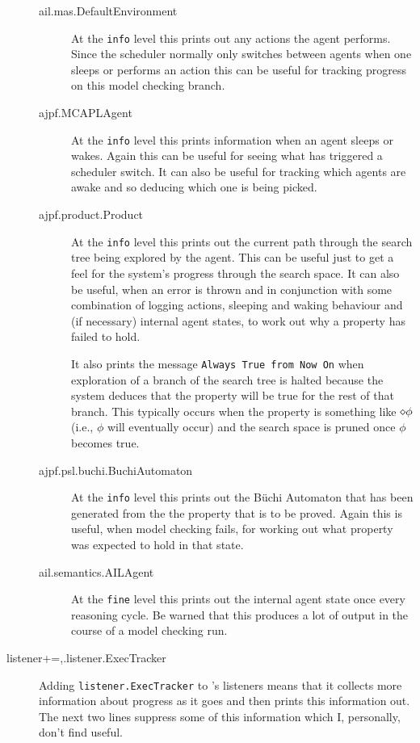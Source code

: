 \documentclass[a4]{article}
\begin{document}
\begin{sloppypar}
\begin{description}
\begin{description}
\item[ail.mas.DefaultEnvironment] At the \texttt{info} level this prints out any actions the agent performs.  Since the scheduler normally only switches between agents when one sleeps or performs an action this can be useful for tracking progress on this model checking branch.
\item[ajpf.MCAPLAgent] At the \texttt{info} level this prints information when an agent sleeps or wakes.  Again this can be useful for seeing what has triggered a scheduler switch.  It can also be useful for tracking which agents are awake and so deducing which one is being picked.
\item[ajpf.product.Product] At the \texttt{info} level this prints out the current path through the search tree being explored by the agent.  This can be useful just to get a feel for the system's progress through the search space.  It can also be useful, when an error is thrown and in conjunction with some combination of logging actions, sleeping and waking behaviour and (if necessary) internal agent states, to work out why a property has failed to hold.

It also prints the message \texttt{Always True from Now On} when exploration of a branch of the search tree is halted because the system deduces that the property will be true for the rest of that branch.  This typically occurs when the property is something like $\diamond \phi$ (i.e., $\phi$ will eventually occur) and the search space is pruned once $\phi$ becomes true.
\item[ajpf.psl.buchi.BuchiAutomaton] At the \texttt{info} level this prints out the B\"{u}chi Automaton that has been generated from the the property that is to be proved.  Again this is useful, when model checking fails, for working out what property was expected to hold in that state.
\item[ail.semantics.AILAgent] At the \texttt{fine} level this prints out the internal agent state once every reasoning cycle.  Be warned that this produces a lot of output in the course of a model checking run.
\end{description}
\item[listener+=,.listener.ExecTracker] Adding \texttt{listener.ExecTracker} to \jpf's listeners means that it collects more information about progress as it goes and then prints this information out.  The next two lines suppress some of this information which I, personally, don't find  useful. 
\end{description}
\end{sloppypar}
\end{document}
